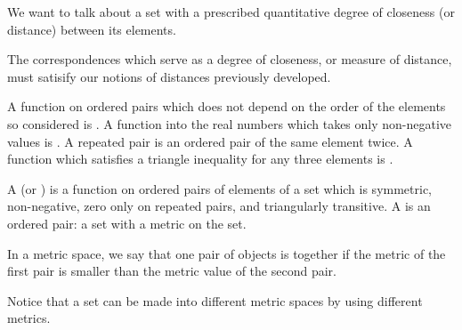 
\sbasic


















\sstart
{}


We want to talk about a set
with a prescribed quantitative
degree of closeness (or distance)
between its elements.


The correspondences
which serve as a
degree of closeness,
or measure of distance, must
satisify our notions of distances
previously developed.

A function on ordered pairs which
does not depend on the order of
the elements so considered is
.
A function into the real numbers
which takes only non-negative
values is .
A repeated pair is an ordered pair
of the same element twice.
A function which satisfies
a triangle inequality for any
three elements is
.

A 
(or )
is a function
on ordered pairs of elements
of a set which
is symmetric, non-negative,
zero only on repeated pairs,
and triangularly
transitive.
A 
is an ordered
pair: a set with
a metric on the set.

In a metric space,
we say that one pair
of objects is 
together if
the metric
of the first pair
is smaller than the
metric value of the
second pair.

Notice that a set can be made into
different metric spaces by using
different metrics.


